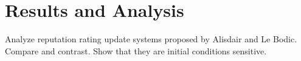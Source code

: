 \section{Results and Analysis} %
\label{sec:results_and_analysis_dynamic}
Analyze reputation rating update systems proposed by Alisdair and Le Bodic. Compare and contrast. Show that they are initial conditions sensitive.
